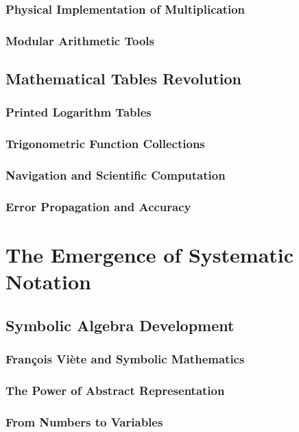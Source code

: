 \documentclass[12pt, oneside, openany]{book}
\begin{document}
\subsubsection{Physical Implementation of Multiplication}
\subsubsection{Modular Arithmetic Tools}

\subsection{Mathematical Tables Revolution}
\subsubsection{Printed Logarithm Tables}
\subsubsection{Trigonometric Function Collections}
\subsubsection{Navigation and Scientific Computation}
\subsubsection{Error Propagation and Accuracy}

\section{The Emergence of Systematic Notation}
\subsection{Symbolic Algebra Development}
\subsubsection{François Viète and Symbolic Mathematics}
\subsubsection{The Power of Abstract Representation}
\subsubsection{From Numbers to Variables}
\end{document}
